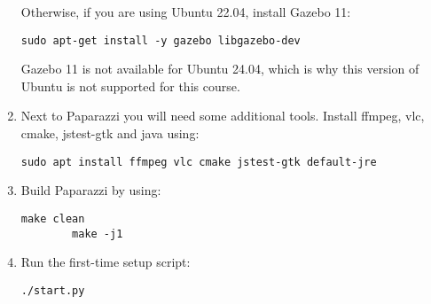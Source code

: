 \begin{enumerate}
    Otherwise, if you are using Ubuntu 22.04, install Gazebo 11:
    \begin{lstlisting}[style=Bash]
        sudo apt-get install -y gazebo libgazebo-dev
    \end{lstlisting}
    Gazebo 11 is not available for Ubuntu 24.04, which is why this version of Ubuntu is not supported for this course.

    \item Next to Paparazzi you will need some additional tools. Install ffmpeg, vlc, cmake, jstest-gtk and java using:
    \begin{lstlisting}[style=Bash]
        sudo apt install ffmpeg vlc cmake jstest-gtk default-jre
    \end{lstlisting}

    \item Build Paparazzi by using:
    \begin{lstlisting}[style=Bash]
        make clean
        make -j1
    \end{lstlisting}

    \item Run the first-time setup script:
    \begin{lstlisting}[style=Bash]
        ./start.py
    \end{lstlisting}
\end{enumerate}